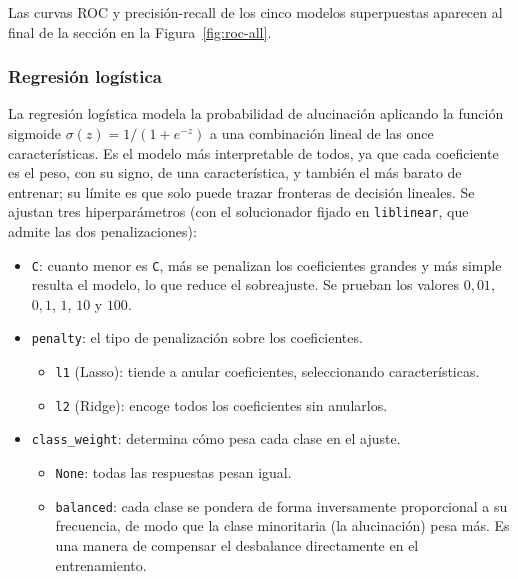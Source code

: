 \documentclass[12pt,a4paper]{report}
\theoremstyle{definition}
\newcommand{\tc}[1]{\texttt{#1}}
\begin{document}
Las curvas ROC y precisión-recall de los cinco modelos superpuestas aparecen al final de la sección en la
Figura~\ref{fig:roc-all}.

\newcommand{\rocw}{0.42\textwidth}

\subsubsection{Regresión logística}

La regresión logística modela la probabilidad de alucinación aplicando la función sigmoide
$\sigma(z)=1/(1+e^{-z})$ a una combinación lineal de las once características.
Es el modelo más interpretable de todos, ya que cada coeficiente es el
peso, con su signo, de una característica, y también el más barato de entrenar; su límite es
que solo puede trazar fronteras de decisión lineales. Se ajustan tres hiperparámetros (con el
solucionador fijado en \tc{liblinear}, que admite las dos penalizaciones):

\begin{itemize}
\item \tc{C}: cuanto menor es \tc{C}, más se
penalizan los coeficientes grandes y más simple resulta el modelo, lo que reduce el
sobreajuste. Se prueban los valores $0{,}01$, $0{,}1$, $1$, $10$ y $100$.
\item \tc{penalty}: el tipo de penalización sobre los coeficientes.
  \begin{itemize}
  \item \tc{l1} (Lasso): tiende a anular coeficientes, seleccionando características.
  \item \tc{l2} (Ridge): encoge todos los coeficientes sin anularlos.
  \end{itemize}
\item \tc{class\_weight}: determina cómo pesa cada clase en el ajuste.
  \begin{itemize}
  \item \tc{None}: todas las respuestas pesan igual.
  \item \tc{balanced}: cada clase se pondera de forma inversamente proporcional a su
  frecuencia, de modo que la clase minoritaria (la alucinación) pesa más. Es una manera de
  compensar el desbalance directamente en el entrenamiento.
  \end{itemize}
\end{itemize}
\end{document}
